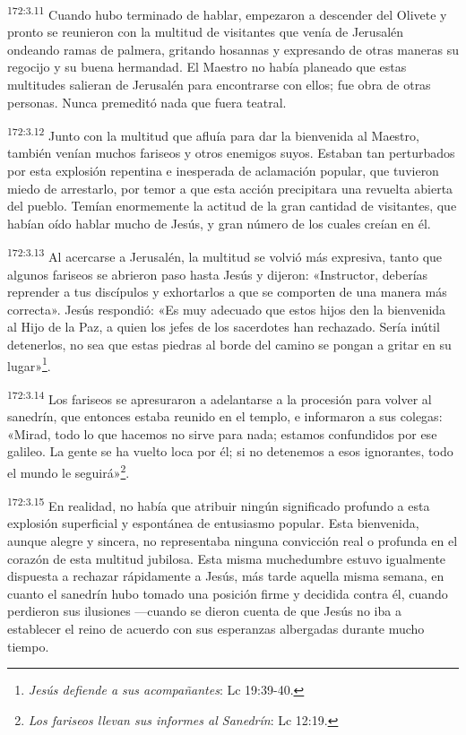 \par 
\textsuperscript{172:3.11} Cuando hubo terminado de hablar, empezaron a descender del Olivete y pronto se reunieron con la multitud de visitantes que venía de Jerusalén ondeando ramas de palmera, gritando hosannas y expresando de otras maneras su regocijo y su buena hermandad. El Maestro no había planeado que estas multitudes salieran de Jerusalén para encontrarse con ellos; fue obra de otras personas. Nunca premeditó nada que fuera teatral.

\par 
\textsuperscript{172:3.12} Junto con la multitud que afluía para dar la bienvenida al Maestro, también venían muchos fariseos y otros enemigos suyos. Estaban tan perturbados por esta explosión repentina e inesperada de aclamación popular, que tuvieron miedo de arrestarlo, por temor a que esta acción precipitara una revuelta abierta del pueblo. Temían enormemente la actitud de la gran cantidad de visitantes, que habían oído hablar mucho de Jesús, y gran número de los cuales creían en él.

\par 
\textsuperscript{172:3.13} Al acercarse a Jerusalén, la multitud se volvió más expresiva, tanto que algunos fariseos se abrieron paso hasta Jesús y dijeron: «Instructor, deberías reprender a tus discípulos y exhortarlos a que se comporten de una manera más correcta». Jesús respondió: «Es muy adecuado que estos hijos den la bienvenida al Hijo de la Paz, a quien los jefes de los sacerdotes han rechazado. Sería inútil detenerlos, no sea que estas piedras al borde del camino se pongan a gritar en su lugar»\footnote{\textit{Jesús defiende a sus acompañantes}: Lc 19:39-40.}.

\par 
\textsuperscript{172:3.14} Los fariseos se apresuraron a adelantarse a la procesión para volver al sanedrín, que entonces estaba reunido en el templo, e informaron a sus colegas: «Mirad, todo lo que hacemos no sirve para nada; estamos confundidos por ese galileo. La gente se ha vuelto loca por él; si no detenemos a esos ignorantes, todo el mundo le seguirá»\footnote{\textit{Los fariseos llevan sus informes al Sanedrín}: Lc 12:19.}.

\par 
\textsuperscript{172:3.15} En realidad, no había que atribuir ningún significado profundo a esta explosión superficial y espontánea de entusiasmo popular. Esta bienvenida, aunque alegre y sincera, no representaba ninguna convicción real o profunda en el corazón de esta multitud jubilosa. Esta misma muchedumbre estuvo igualmente dispuesta a rechazar rápidamente a Jesús, más tarde aquella misma semana, en cuanto el sanedrín hubo tomado una posición firme y decidida contra él, cuando perdieron sus ilusiones ---cuando se dieron cuenta de que Jesús no iba a establecer el reino de acuerdo con sus esperanzas albergadas durante mucho tiempo.

